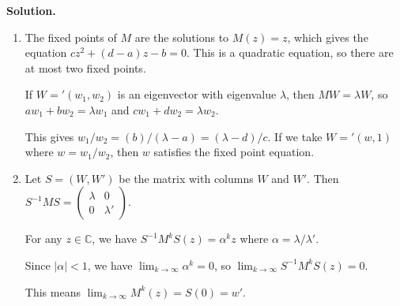 \noindent\textbf{Solution.}
\begin{enumerate}[label=(\alph*)]
\item The fixed points of $M$ are the solutions to $M(z) = z$, which gives the equation $cz^2 + (d-a)z - b = 0$. This is a quadratic equation, so there are at most two fixed points.

If $W = '(w_1, w_2)$ is an eigenvector with eigenvalue $\lambda$, then $MW = \lambda W$, so $aw_1 + bw_2 = \lambda w_1$ and $cw_1 + dw_2 = \lambda w_2$.

This gives $w_1/w_2 = (b)/(\lambda - a) = (\lambda - d)/c$. If we take $W = '(w, 1)$ where $w = w_1/w_2$, then $w$ satisfies the fixed point equation.

\item Let $S = (W, W')$ be the matrix with columns $W$ and $W'$. Then $S^{-1}MS = \begin{pmatrix} \lambda & 0 \\ 0 & \lambda' \end{pmatrix}$.

For any $z \in \mathbb{C}$, we have $S^{-1}M^kS(z) = \alpha^k z$ where $\alpha = \lambda/\lambda'$.

Since $|\alpha| < 1$, we have $\lim_{k \to \infty} \alpha^k = 0$, so $\lim_{k \to \infty} S^{-1}M^kS(z) = 0$.

This means $\lim_{k \to \infty} M^k(z) = S(0) = w'$.
\end{enumerate}

